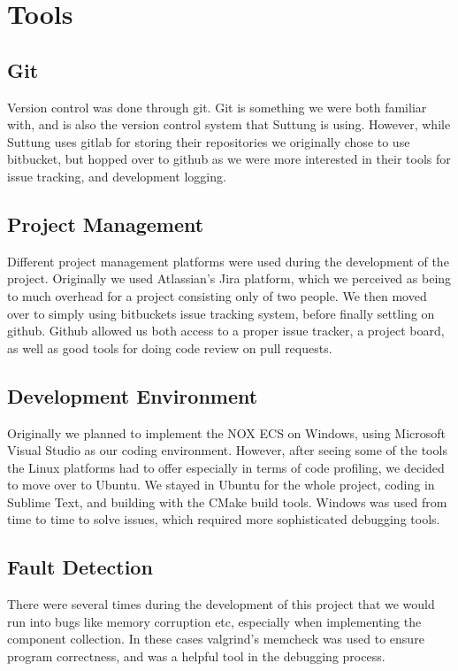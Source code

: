 \section{Tools}
\subsection{Git}
Version control was done through git. Git is something we were both familiar with, and is also the version control
system that Suttung is using. However, while Suttung uses gitlab for storing their repositories we originally
chose to use bitbucket, but hopped over to github as we were more interested in their tools for issue tracking,
and development logging.

\subsection{Project Management}
Different project management platforms were used during the development of the project.
Originally we used Atlassian's Jira platform, which we perceived as being to much overhead for a project
consisting only of two people. We then moved over to simply using bitbuckets issue tracking system, before finally
settling on github. Github allowed us both access to a proper issue tracker, a project board, as well as good tools
for doing code review on pull requests.

\subsection{Development Environment}
Originally we planned to implement the NOX ECS on Windows, using Microsoft Visual Studio as our coding environment.
However, after seeing some of the tools the Linux platforms had to offer especially in terms of code profiling,
we decided to move over to Ubuntu.
We stayed in Ubuntu for the whole project, coding in Sublime Text, and building with the CMake build tools.
Windows was used from time to time to solve issues, which required more sophisticated debugging tools.

\subsection{Fault Detection}
There were several times during the development of this project that we would run into bugs like memory corruption etc,
especially when implementing the component collection.
In these cases valgrind's memcheck was used to ensure program correctness, and was a helpful tool in the debugging process.
